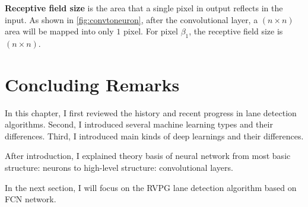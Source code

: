 \begin{spacing}{1.5}
\textbf{Receptive field size} is the area that a single pixel in output reflects in the input. As shown in \autoref{fig:convtoneuron}, after the convolutional layer, a $(n \times n)$ area will be mapped into only $1$ pixel. For pixel $\beta_1$, the receptive field size is $(n \times n)$.

\section{Concluding Remarks}

In this chapter, I first reviewed the history and recent progress in lane detection algorithms. Second, I introduced several machine learning types and their differences. Third, I introduced main kinds of deep learnings and their differences. 

After introduction, I explained theory basis of neural network from most basic structure: neurons to high-level structure: convolutional layers.

In the next section, I will focus on the RVPG lane detection algorithm based on FCN network.

\end{spacing}
\newpage
